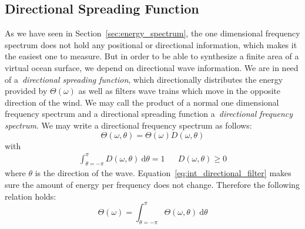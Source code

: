 \subsection{Directional Spreading Function}
As we have seen in
Section~\ref{sec:energy_spectrum}, the one dimensional frequency spectrum does
not hold any positional or directional information, which makes it the
easiest one to measure. But in order to be able to synthesize a finite area of a
virtual ocean surface, we depend on directional wave information. We are in need 
of a~\emph{directional spreading function}, which directionally distributes the
energy provided by $\Theta(\omega)$ as well as filters wave trains which move in
the opposite direction of the wind. We may call the product of a normal one
dimensional frequency spectrum and a directional spreading function
a~\emph{directional frequency spectrum}. We may write a directional frequency
spectrum as follows:
\begin{equation}
 \label{eq:directional_frequency_spectrum}
 \Theta(\omega, \theta) = \Theta(\omega)D(\omega,\theta)
\end{equation}
with
\begin{align}
\label{eq:int_directional_filter}
 \int_{\theta=-\pi}^{\pi}D(\omega,\theta)~\mathrm{d}\theta = 1 && D(\omega,\theta) \geq 0
\end{align}
where $\theta$ is the direction of the wave.
Equation~\ref{eq:int_directional_filter} makes sure the amount of energy per
frequency does not change. Therefore the following relation holds:
\begin{equation*}
 \Theta(\omega) = \int_{\theta=-\pi}^{\pi}\Theta(\omega,
\theta)~\mathrm{d}\theta
\end{equation*}
%
